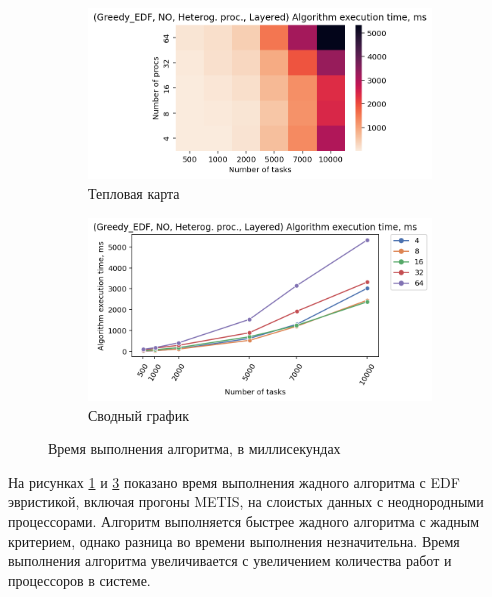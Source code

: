 \begin{figure}[!htbp]
    \centering
    \begin{subfigure}{0.49\textwidth}
        \includegraphics[width=\textwidth]{imgs/unbalanced/NO_EDF/et_heatmap.png}
        \caption{Тепловая карта}
        \label{fig:NO-unbalanced-EDF-exec-time-heatmap}
    \end{subfigure}
    \hfill
    \begin{subfigure}{0.49\textwidth}
        \includegraphics[width=\textwidth]{imgs/unbalanced/NO_EDF/tr_graph.png}
        \caption{Сводный график}
        \label{fig:NO-unbalanced-EDF-exec-time-compiled}
    \end{subfigure}
    \caption{Время выполнения алгоритма, в миллисекундах}
\end{figure}

На рисунках \ref{fig:NO-unbalanced-EDF-exec-time-heatmap} и \ref{fig:NO-unbalanced-EDF-exec-time-compiled} показано время выполнения жадного алгоритма с EDF эвристикой, включая прогоны METIS, на слоистых данных с неоднородными процессорами. Алгоритм выполняется быстрее жадного алгоритма с жадным критерием, однако разница во времени выполнения незначительна. Время выполнения алгоритма увеличивается с увеличением количества работ и процессоров в системе.